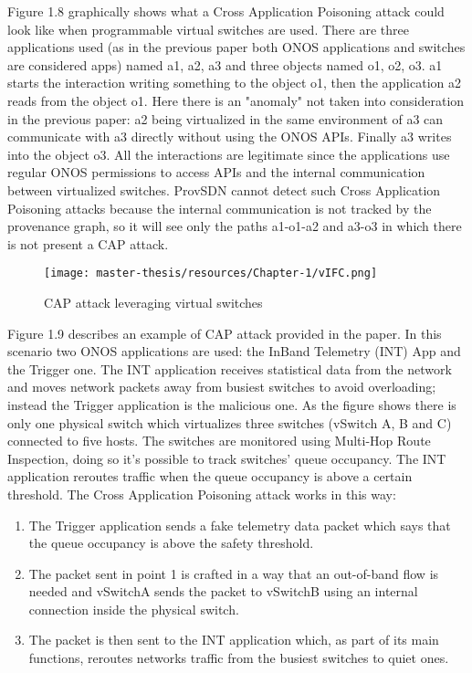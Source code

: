 \documentclass[a4paper,10pt]{memoir}
\begin{document}
Figure 1.8 graphically shows what a Cross Application Poisoning attack could look like when programmable virtual switches are used. There are three applications used (as in the previous paper both ONOS applications and switches are considered apps) named a1, a2, a3 and three objects named o1, o2, o3. a1 starts the interaction writing something to the object o1, then the application a2 reads from the object o1. Here there is an "anomaly" not taken into consideration in the previous paper: a2 being virtualized in the same environment of a3 can communicate with a3 directly without using the ONOS APIs. Finally a3 writes into the object o3. All the interactions are legitimate since the applications use regular ONOS permissions to access APIs and the internal communication between virtualized switches. ProvSDN cannot detect such Cross Application Poisoning attacks because the internal communication is not tracked by the provenance graph, so it will see only the paths a1-o1-a2 and a3-o3 in which there is not present a CAP attack.
\begin{figure}[h]
\caption{CAP attack leveraging virtual switches}
\label{fig:vifc}
\texttt{[image: master-thesis/resources/Chapter-1/vIFC.png]}
\centering
\end{figure}
Figure 1.9 describes an example of CAP attack provided in the paper. In this scenario two ONOS applications are used: the InBand Telemetry (INT) App and the Trigger one. The INT application receives statistical data from the network and moves network packets away from busiest switches to avoid overloading; instead the Trigger application is the malicious one. As the figure shows there is only one physical switch which virtualizes three switches (vSwitch A, B and C) connected to five hosts. The switches are monitored using Multi-Hop Route Inspection, doing so it's possible to track switches' queue occupancy. The INT application reroutes traffic when the queue occupancy is above a certain threshold. The Cross Application Poisoning attack works in this way:
\begin{enumerate}
    \item The Trigger application sends a fake telemetry data packet which says that the queue occupancy is above the safety threshold.
    \item The packet sent in point 1 is crafted in a way that an out-of-band flow is needed and vSwitchA sends the packet to vSwitchB using an internal connection inside the physical switch. 
    \item The packet is then sent to the INT application which, as part of its main functions, reroutes networks traffic from the busiest switches to quiet ones. 
\end{enumerate}
\end{document}

